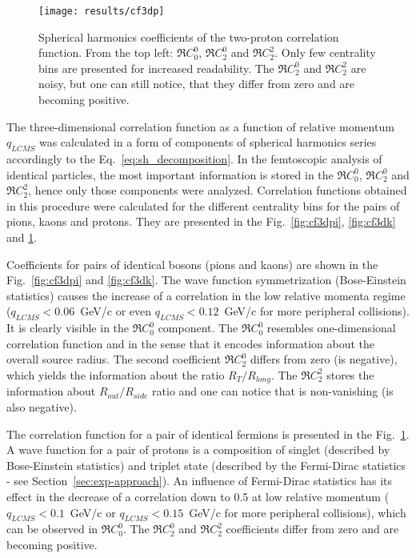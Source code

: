       \begin{figure}[b]
        \centering
        \centerline{\texttt{[image: results/cf3dp]}}
        \caption{Spherical harmonics coefficients of the two-proton correlation function. From the top left: $\Re C^0_0$, $\Re C^0_2$ and $\Re C^2_2$. Only few centrality bins are presented for increased readability. The $\Re C^0_2$ and $\Re C^2_2$ are noisy, but one can still notice, that they differ from zero and are becoming positive.}
      \label{fig:cf3dp}
      \end{figure}

      The three-dimensional correlation function as a function of relative momentum $q_{LCMS}$ was calculated in a form of components of spherical harmonics series accordingly to the Eq.~\ref{eq:sh_decomposition}.
      In the femtoscopic analysis of identical particles, the most important information is stored in the $\Re C^0_0$, $\Re C^0_2$ and $\Re C^2_2$, hence only those components were analyzed.
      Correlation functions obtained in this procedure were calculated for the different centrality bins for the pairs of pions, kaons and protons.
      They are presented in the Fig.~\ref{fig:cf3dpi}, \ref{fig:cf3dk} and \ref{fig:cf3dp}.
      
      Coefficients for pairs of identical bosons (pions and kaons) are shown in the Fig.~\ref{fig:cf3dpi} and \ref{fig:cf3dk}.
      The wave function symmetrization (Bose-Einstein statistics) causes the increase of a correlation in the low relative momenta regime (\mbox{$q_{LCMS}<0.06$~GeV/c} or even \mbox{$q_{LCMS}<0.12$~GeV/c} for more peripheral collisions).
      It is clearly visible in the $\Re C^0_0$ component.
      The $\Re C_0^0$ resembles one-dimensional correlation function and in the sense that it encodes information about the overall source radius.
      The second coefficient $\Re C^0_2$ differs from zero (is negative), which yields the information about the ratio $R_T / R_{long}$.
      The $\Re C^2_2$ stores the information about $R_{out} / R_{side}$ ratio and one can notice that is non-vanishing (is also negative).

      The correlation function for a pair of identical fermions is presented in the Fig.~\ref{fig:cf3dp}.
      A wave function for a pair of protons is a composition of singlet (described by Bose-Einstein statistics) and triplet state (described by the Fermi-Dirac statistics - see Section~\ref{sec:exp-approach}).
      An influence of Fermi-Dirac statistics has its effect in the decrease of a correlation down to 0.5 at low relative momentum (\mbox{$q_{LCMS}<0.1$~GeV/c} or \mbox{$q_{LCMS}<0.15$~GeV/c} for more peripheral collisions), which can be observed in $\Re C^0_0$.
      The $\Re C^0_2$ and $\Re C^2_2$ coefficients differ from zero and are becoming positive.

